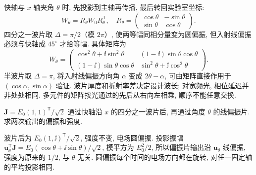 快轴与 $x$ 轴夹角 $\theta$ 时, 先投影到主轴再传播, 最后转回实验室坐标:
\[
W_\theta=R_\theta W_0R_\theta^{\mathsf T},\quad
R_\theta=\begin{pmatrix}\cos\theta&-\sin\theta\\\sin\theta&\cos\theta\end{pmatrix}.
\]
四分之一波片取 $\Delta=\pi/2$（模 $2\pi$）, 使两等幅同相分量变为圆偏振, 但入射线偏振必须与快轴成 $45^\circ$ 才给等幅. 具体矩阵为
\[
W_\theta=\begin{pmatrix}
\cos^2\theta+\ii\sin^2\theta&(1-\ii)\sin\theta\cos\theta\\
(1-\ii)\sin\theta\cos\theta&\sin^2\theta+\ii\cos^2\theta
\end{pmatrix}.
\]
半波片取 $\Delta=\pi$, 将入射线偏振方向角 $\alpha$ 变成 $2\theta-\alpha$, 可由矩阵直接作用于 $(\cos\alpha,\sin\alpha)$ 验证. 波片厚度和折射率差决定设计波长; 对宽频光, 相位延迟并非处处相同. 多元件的矩阵按光通过的先后从右向左相乘, 顺序不能任意交换.

\begin{example}
$\boldsymbol J=E_0(1,1)^{\mathsf T}/\sqrt2$ 通过快轴沿 $x$ 的四分之一波片后, 再通过角度 $\theta$ 的线偏振片. 求两次输出的偏振和强度.
\end{example}
\begin{solution}
波片后为 $E_0(1,\ii)^{\mathsf T}/\sqrt2$, 强度不变, 电场圆偏振. 投影振幅 $\boldsymbol u_\theta^{\mathsf T}\boldsymbol J=E_0(\cos\theta+\ii\sin\theta)/\sqrt2$, 模平方为 $E_0^2/2$, 所以偏振片输出沿 $\boldsymbol u_\theta$ 线偏振, 强度为原来的 $1/2$, 与 $\theta$ 无关. 圆偏振每个时间的电场方向都在旋转, 对任一固定轴的平均投影相同.
\end{solution}
